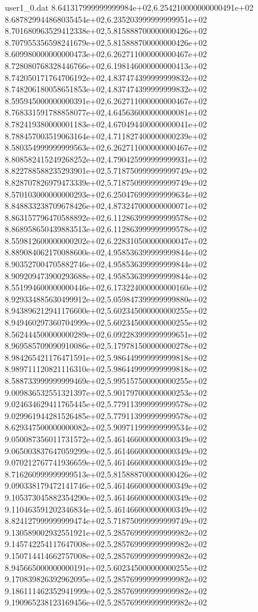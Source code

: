 \begin{filecontents}{user1_0.dat}
8.641317999999999984e+02,6.254210000000000491e+02
8.687829944868035454e+02,6.235203999999999951e+02
8.701680963529412338e+02,5.815888700000000426e+02
8.707955356598241679e+02,5.815888700000000426e+02
8.609980000000000473e+02,6.262711000000000467e+02
8.728080768328446766e+02,6.198146000000000413e+02
8.742050171764706192e+02,4.837474399999999832e+02
8.748206180058651853e+02,4.837474399999999832e+02
8.595945000000000391e+02,6.262711000000000467e+02
8.768331591788858077e+02,4.645636000000000081e+02
8.782419380000001183e+02,4.670494400000000041e+02
8.788457003519063164e+02,4.711827400000000239e+02
8.580354999999999563e+02,6.262711000000000467e+02
8.808582415249268252e+02,4.790425999999999931e+02
8.822788588235293901e+02,5.718750999999999749e+02
8.828707826979473339e+02,5.718750999999999749e+02
8.570103000000000293e+02,6.250476999999999634e+02
8.848833238709678426e+02,4.873247000000000071e+02
8.863157796470588892e+02,6.112863999999999578e+02
8.868958650439883513e+02,6.112863999999999578e+02
8.559812600000000202e+02,6.228310500000000047e+02
8.889084062170088600e+02,4.958536399999999844e+02
8.903527004705882746e+02,4.958536399999999844e+02
8.909209473900293688e+02,4.958536399999999844e+02
8.551994600000000446e+02,6.173224000000000160e+02
8.929334885630499912e+02,5.059847399999999880e+02
8.943896212941176600e+02,5.602345000000000255e+02
8.949460297360704999e+02,5.602345000000000255e+02
8.562444500000000289e+02,6.092283999999999651e+02
8.969585709090910086e+02,5.179781500000000278e+02
8.984265421176471591e+02,5.986449999999999818e+02
8.989711120821116310e+02,5.986449999999999818e+02
8.588733999999999469e+02,5.995157500000000255e+02
9.009836532551321397e+02,5.901797000000000253e+02
9.024634629411765445e+02,5.779113999999999578e+02
9.029961944281526485e+02,5.779113999999999578e+02
8.629347500000000082e+02,5.909711999999999534e+02
9.050087356011731572e+02,5.461466000000000349e+02
9.065003837647059299e+02,5.461466000000000349e+02
9.070212767741936659e+02,5.461466000000000349e+02
8.716260999999999513e+02,5.815888700000000426e+02
9.090338179472141746e+02,5.461466000000000349e+02
9.105373045882354290e+02,5.461466000000000349e+02
9.110463591202346834e+02,5.461466000000000349e+02
8.824127999999999474e+02,5.718750999999999749e+02
9.130589002932551921e+02,5.285769999999999982e+02
9.145742254117647008e+02,5.285769999999999982e+02
9.150714414662757008e+02,5.285769999999999982e+02
8.945665000000000191e+02,5.602345000000000255e+02
9.170839826392962095e+02,5.285769999999999982e+02
9.186111462352941999e+02,5.285769999999999982e+02
9.190965238123169456e+02,5.285769999999999982e+02

\end{filecontents}

